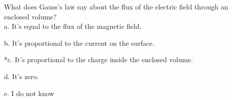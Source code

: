 
What does Gauss's law say about the flux of the electric field through an enclosed volume? \\

a. It's equal to the flux of the magnetic field.

b. It’s proportional to the current on the surface.

*c. It’s proportional to the charge inside the enclosed volume.

d. It’s zero.

e. I do not know \\
